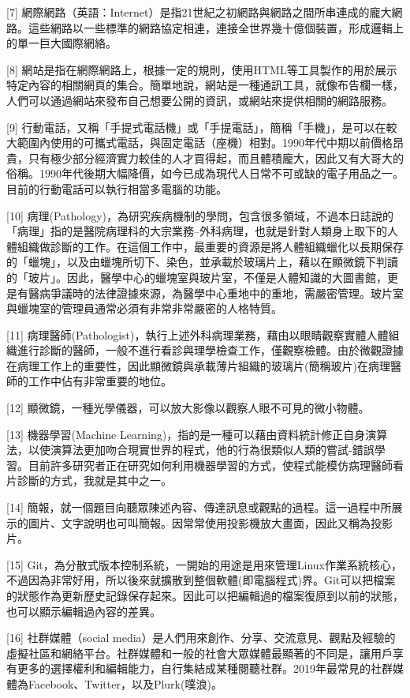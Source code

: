 \documentclass[a5paper, 12pt
]{book}
\begin{document}
{[}7{]}
網際網路（英語：Internet）是指21世紀之初網路與網路之間所串連成的龐大網路。這些網路以一些標準的網路協定相連，連接全世界幾十億個裝置，形成邏輯上的單一巨大國際網絡。

{[}8{]}
網站是指在網際網路上，根據一定的規則，使用HTML等工具製作的用於展示特定內容的相關網頁的集合。簡單地說，網站是一種通訊工具，就像布告欄一樣，人們可以通過網站來發布自己想要公開的資訊，或網站來提供相關的網路服務。

{[}9{]}
行動電話，又稱「手提式電話機」或「手提電話」，簡稱「手機」，是可以在較大範圍內使用的可攜式電話，與固定電話（座機）相對。1990年代中期以前價格昂貴，只有極少部分經濟實力較佳的人才買得起，而且體積龐大，因此又有大哥大的俗稱。1990年代後期大幅降價，如今已成為現代人日常不可或缺的電子用品之一。目前的行動電話可以執行相當多電腦的功能。

{[}10{]}
病理(Pathology)，為研究疾病機制的學問，包含很多領域，不過本日誌說的「病理」指的是醫院病理科的大宗業務--外科病理，也就是針對人類身上取下的人體組織做診斷的工作。在這個工作中，最重要的資源是將人體組織蠟化以長期保存的「蠟塊」，以及由蠟塊所切下、染色，並承載於玻璃片上，藉以在顯微鏡下判讀的「玻片」。因此，醫學中心的蠟塊室與玻片室，不僅是人體知識的大圖書館，更是有醫病爭議時的法律證據來源，為醫學中心重地中的重地，需嚴密管理。玻片室與蠟塊室的管理員通常必須有非常非常嚴密的人格特質。

{[}11{]}
病理醫師(Pathologist)，執行上述外科病理業務，藉由以眼睛觀察實體人體組織進行診斷的醫師，一般不進行看診與理學檢查工作，僅觀察檢體。由於微觀證據在病理工作上的重要性，因此顯微鏡與承載薄片組織的玻璃片(簡稱玻片)在病理醫師的工作中佔有非常重要的地位。

{[}12{]} 顯微鏡，一種光學儀器，可以放大影像以觀察人眼不可見的微小物體。

{[}13{]} 機器學習(Machine
Learning)，指的是一種可以藉由資料統計修正自身演算法，以使演算法更加吻合現實世界的程式，他的行為很類似人類的嘗試-錯誤學習。目前許多研究者正在研究如何利用機器學習的方式，使程式能模仿病理醫師看片診斷的方式，我就是其中之一。

{[}14{]}
簡報，就一個題目向聽眾陳述內容、傳達訊息或觀點的過程。這一過程中所展示的圖片、文字說明也可叫簡報。因常常使用投影機放大畫面，因此又稱為投影片。

{[}15{]}
Git，為分散式版本控制系統，一開始的用途是用來管理Linux作業系統核心，不過因為非常好用，所以後來就擴散到整個軟體(即電腦程式)界。Git可以把檔案的狀態作為更新歷史記錄保存起來。因此可以把編輯過的檔案復原到以前的狀態，也可以顯示編輯過內容的差異。

{[}16{]} 社群媒體（social
media）是人們用來創作、分享、交流意見、觀點及經驗的虛擬社區和網絡平台。社群媒體和一般的社會大眾媒體最顯著的不同是，讓用戶享有更多的選擇權利和編輯能力，自行集結成某種閱聽社群。2019年最常見的社群媒體為Facebook、Twitter，以及Plurk(噗浪)。
\end{document}
